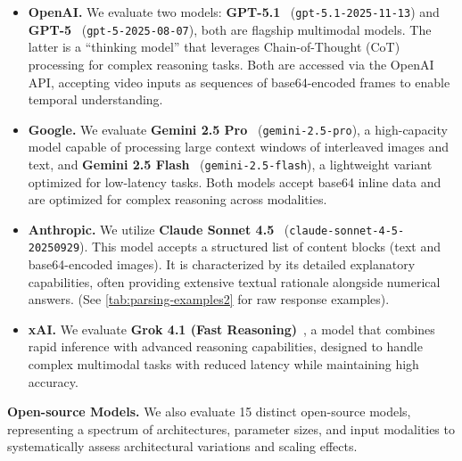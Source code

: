 \begin{itemize}
    \item \textbf{OpenAI.} We evaluate two models: \textbf{GPT-5.1}~\cite{OpenAIgpt5.1} (\texttt{gpt-5.1-2025-11-13}) and \textbf{GPT-5}~\cite{OpenAIgpt5} (\texttt{gpt-5-2025-08-07}), both are flagship multimodal models. The latter is a ``thinking model'' that leverages Chain-of-Thought (CoT) processing for complex reasoning tasks. Both are accessed via the OpenAI API, accepting video inputs as sequences of base64-encoded frames to enable temporal understanding.
    
    \item \textbf{Google.} We evaluate \textbf{Gemini 2.5 Pro}~\cite{google2025gemini25pro} (\texttt{gemini-2.5-pro}), a high-capacity model capable of processing large context windows of interleaved images and text, and \textbf{Gemini 2.5 Flash}~\cite{google2025gemini25flash} (\texttt{gemini-2.5-flash}), a lightweight variant optimized for low-latency tasks. Both models accept base64 inline data and are optimized for complex reasoning across modalities.
    
    \item \textbf{Anthropic.} We utilize \textbf{Claude Sonnet 4.5}~\cite{anthropic2025claude45sonnet} (\texttt{claude-sonnet-4-5-20250929}). This model accepts a structured list of content blocks (text and base64-encoded images). It is characterized by its detailed explanatory capabilities, often providing extensive textual rationale alongside numerical answers. (See \autoref{tab:parsing-examples2} for raw response examples).

    \item \textbf{xAI.} We evaluate \textbf{Grok 4.1 (Fast Reasoning)}~\cite{xai2025grok41}, a model that combines rapid inference with advanced reasoning capabilities, designed to handle complex multimodal tasks with reduced latency while maintaining high accuracy.

\end{itemize}



\noindent \textbf{Open-source Models.} We also evaluate 15 distinct open-source models, representing a spectrum of architectures, parameter sizes, and input modalities to systematically assess architectural variations and scaling effects.

